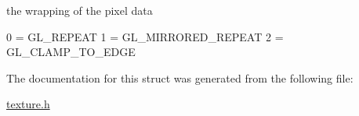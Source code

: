 the wrapping of the pixel data 

0 = G\+L\+\_\+\+R\+E\+P\+E\+AT 1 = G\+L\+\_\+\+M\+I\+R\+R\+O\+R\+E\+D\+\_\+\+R\+E\+P\+E\+AT 2 = G\+L\+\_\+\+C\+L\+A\+M\+P\+\_\+\+T\+O\+\_\+\+E\+D\+GE 

The documentation for this struct was generated from the following file\+:\begin{DoxyCompactItemize}
\item 
\hyperlink{texture_8h}{texture.\+h}\end{DoxyCompactItemize}
